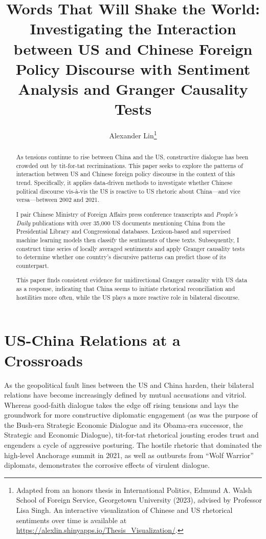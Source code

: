 \documentclass[12pt,letterpaper]{article}
\title{\textbf{Words That Will Shake the World:}\\[0.3em]
  \large Investigating the Interaction between US and Chinese Foreign Policy Discourse with Sentiment Analysis and Granger Causality Tests}
\author{Alexander Lin\thanks{Adapted from an honors thesis in International Politics, Edmund A. Walsh School of Foreign Service, Georgetown University (2023), advised by Professor Lisa Singh. An interactive visualization of Chinese and US rhetorical sentiments over time is available at \url{https://alexlin.shinyapps.io/Thesis_Visualization/}.}}
\date{}
\begin{document}
\begin{singlespace}
\maketitle
\end{singlespace}

\begin{abstract}
\noindent
As tensions continue to rise between China and the US, constructive dialogue has been crowded out by tit-for-tat recriminations. This paper seeks to explore the patterns of interaction between US and Chinese foreign policy discourse in the context of this trend. Specifically, it applies data-driven methods to investigate whether Chinese political discourse vis-à-vis the US is reactive to US rhetoric about China---and vice versa---between 2002 and 2021.

I pair Chinese Ministry of Foreign Affairs press conference transcripts and \emph{People's Daily} publications with over 35,000 US documents mentioning China from the Presidential Library and Congressional databases. Lexicon-based and supervised machine learning models then classify the sentiments of these texts. Subsequently, I construct time series of locally averaged sentiments and apply Granger causality tests to determine whether one country's discursive patterns can predict those of its counterpart. 

This paper finds consistent evidence for unidirectional Granger causality with US data as a response, indicating that China seems to initiate rhetorical reconciliation and hostilities more often, while the US plays a more reactive role in bilateral discourse. 
\end{abstract}

\section{US-China Relations at a Crossroads}
\label{sec:intro}

As the geopolitical fault lines between the US and China harden, their bilateral relations have become increasingly defined by mutual accusations and vitriol. Whereas good-faith dialogue takes the edge off rising tensions and lays the groundwork for more constructive diplomatic engagement (as was the purpose of the Bush-era Strategic Economic Dialogue and its Obama-era successor, the Strategic and Economic Dialogue), tit-for-tat rhetorical jousting erodes trust and engenders a cycle of aggressive posturing. The hostile rhetoric that dominated the high-level Anchorage summit in 2021, as well as outbursts from ``Wolf Warrior'' diplomats, demonstrates the corrosive effects of virulent dialogue.
\end{document}
